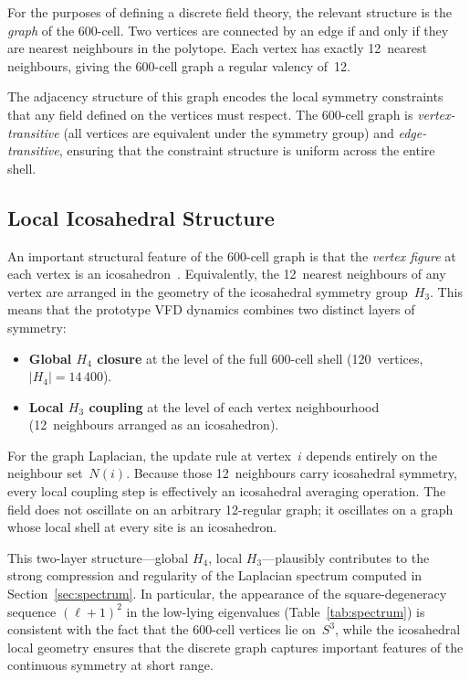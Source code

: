 \documentclass[12pt,a4paper]{article}
\newcommand{\Hfour}{H_4}
\newcommand{\Hthree}{H_3}
\begin{document}
For the purposes of defining a discrete field theory, the relevant structure
is the \emph{graph} of the 600-cell.  Two vertices are connected by an edge if
and only if they are nearest neighbours in the polytope.  Each vertex has
exactly 12~nearest neighbours, giving the 600-cell graph a regular valency
of~12.

The adjacency structure of this graph encodes the local symmetry constraints
that any field defined on the vertices must respect.  The 600-cell graph is
\emph{vertex-transitive} (all vertices are equivalent under the symmetry
group) and \emph{edge-transitive}, ensuring that the constraint structure is
uniform across the entire shell.

\subsection{Local Icosahedral Structure}\label{sec:local_ico}

An important structural feature of the 600-cell graph is that the
\emph{vertex figure} at each vertex is an icosahedron~\cite{coxeter1991}.
Equivalently, the 12~nearest neighbours of any vertex are arranged in the
geometry of the icosahedral symmetry group~$\Hthree$.  This means that the
prototype VFD dynamics combines two distinct layers of symmetry:

\begin{itemize}[nosep]
  \item \textbf{Global $\Hfour$ closure} at the level of the full 600-cell
    shell (120~vertices, $|H_4|=14\,400$).
  \item \textbf{Local $\Hthree$ coupling} at the level of each vertex
    neighbourhood (12~neighbours arranged as an icosahedron).
\end{itemize}

For the graph Laplacian, the update rule at vertex~$i$ depends entirely on
the neighbour set~$N(i)$.  Because those 12~neighbours carry icosahedral
symmetry, every local coupling step is effectively an icosahedral averaging
operation.  The field does not oscillate on an arbitrary 12-regular graph; it
oscillates on a graph whose local shell at every site is an icosahedron.

This two-layer structure---global $\Hfour$, local $\Hthree$---plausibly
contributes to the strong compression and regularity of the Laplacian
spectrum computed in Section~\ref{sec:spectrum}.  In particular, the
appearance of the square-degeneracy sequence $(\ell+1)^2$ in the low-lying
eigenvalues (Table~\ref{tab:spectrum}) is consistent with the fact that the
600-cell vertices lie on~$S^3$, while the icosahedral local geometry ensures
that the discrete graph captures important features of the continuous
symmetry at short range.
\end{document}

